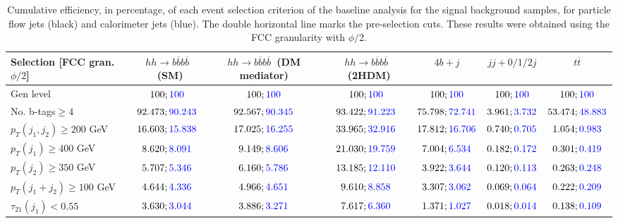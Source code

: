 \begin{landscape}
		\begin{table}
			\centering
			\caption{Cumulative efficiency, in percentage, of each event selection criterion of the baseline analysis for the signal background samples, for particle flow jets (black) and calorimeter jets (blue). The double horizontal line marks the pre-selection cuts. These results were obtained using the FCC granularity with $\phi/2$.}
			\begin{tabular}{lcccccc}
				\toprule 
				\textbf{Selection [FCC gran. $\phi/2$]} & $hh\rightarrow b\overline{b}b\overline{b}$~(SM) & $hh\rightarrow b\overline{b}b\overline{b}$~(DM mediator) & $hh\rightarrow b\overline{b}b\overline{b}$~(2HDM) & $4b+j$  & $jj+0/1/2 j$ & $t\overline{t}$ \\
				\midrule
				Gen level & $100;\textcolor{blue}{100}$ & $100;\textcolor{blue}{100}$ &$100;\textcolor{blue}{100}$& $100;\textcolor{blue}{100}$& $100;\textcolor{blue}{100}$& $100;\textcolor{blue}{100}$ \\
				\rowcolor{black!7}No. b-tags$\geq 4$&$92.473;\textcolor{blue}{90.243}$&$92.567;\textcolor{blue}{90.345}$&$93.422;\textcolor{blue}{91.223}$&$75.798;\textcolor{blue}{72.741}$&$3.961;\textcolor{blue}{3.732}$&$53.474;\textcolor{blue}{48.883}$\\
				$p_T(j_1,j_2)\geq200$ GeV & $16.603;\textcolor{blue}{15.838}$ & $17.025;\textcolor{blue}{16.255}$&$33.965;\textcolor{blue}{32.916}$ &$17.812;\textcolor{blue}{16.706}$&$0.740;\textcolor{blue}{0.705}$&$1.054;\textcolor{blue}{0.983}$\\
				\midrule \midrule
				\rowcolor{black!7}$p_T(j_1)\geq 400$ GeV & $8.620;\textcolor{blue}{8.091}$ &$9.149;\textcolor{blue}{8.606}$  &$21.030;\textcolor{blue}{19.759}$&$7.004;\textcolor{blue}{6.534}$&$0.182;\textcolor{blue}{0.172}$&$0.301;\textcolor{blue}{0.419}$\\ 
				$p_T(j_2)\geq 350$ GeV & $5.707;\textcolor{blue}{5.346}$& $6.160;\textcolor{blue}{5.786}$&$13.185;\textcolor{blue}{12.110}$&$3.922;\textcolor{blue}{3.644}$&$0.120;\textcolor{blue}{0.113}$&$0.263;\textcolor{blue}{0.248}$\\
				\rowcolor{black!7}$p_T(j_1+j_2)\geq 100$ GeV &$4.644;\textcolor{blue}{4.336}$ & $4.966;\textcolor{blue}{4.651}$ &$9.610;\textcolor{blue}{8.858}$&$3.307;\textcolor{blue}{3.062}$&$0.069;\textcolor{blue}{0.064}$&$0.222;\textcolor{blue}{0.209}$\\
				$\tau_{21}(j_1)<0.55$ & $3.630;\textcolor{blue}{3.044}$& $3.886;\textcolor{blue}{3.271}$&$7.617;\textcolor{blue}{6.360}$&$1.371;\textcolor{blue}{1.027}$&$0.018;\textcolor{blue}{0.014}$&$0.138;\textcolor{blue}{0.109}$\\

\end{tabular}
\end{table}
\end{landscape}

